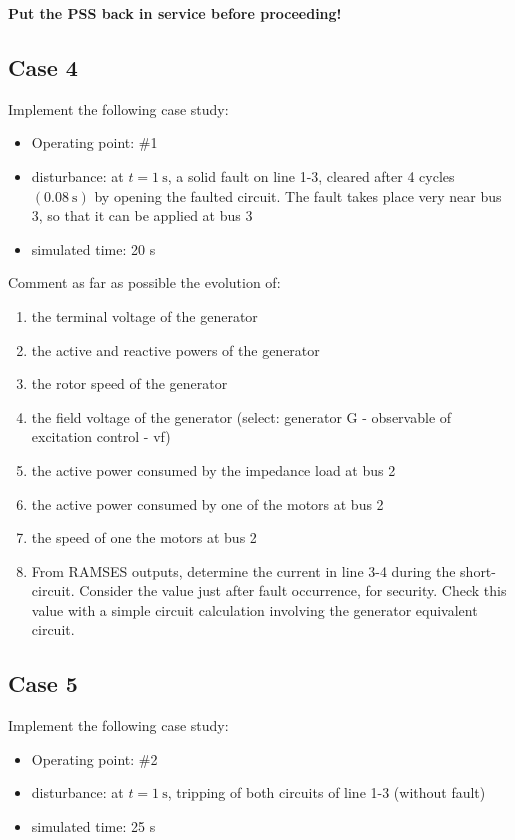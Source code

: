 \documentclass[a4paper,11pt,oneside,onecolumn]{article}
\begin{document}
\noindent \textbf{Put the PSS back in service before proceeding!}

\subsection{Case 4}

Implement the following case study:
\begin{itemize}
\item Operating point: \#1
\item disturbance: at $t=1 \mathrm{~s}$, a solid fault on line 1-3, cleared after 4 cycles $(0.08 \mathrm{~s})$ by opening the faulted circuit. The fault takes place very near bus 3, so that it can be applied at bus 3
\item simulated time: 20 s
\end{itemize}

\noindent Comment as far as possible the evolution of:
\begin{enumerate}
\item the terminal voltage of the generator
\item the active and reactive powers of the generator
\item the rotor speed of the generator
\item the field voltage of the generator (select: generator G - observable of excitation control - vf)
\item the active power consumed by the impedance load at bus 2
\item the active power consumed by one of the motors at bus 2
\item the speed of one the motors at bus 2
\item From RAMSES outputs, determine the current in line 3-4 during the short-circuit. Consider the value just after fault occurrence, for security. Check this value with a simple circuit calculation involving the generator equivalent circuit.
\end{enumerate}

\subsection{Case 5}

Implement the following case study:
\begin{itemize}
\item Operating point: \#2
\item disturbance: at $t=1 \mathrm{~s}$, tripping of both circuits of line 1-3 (without fault)
\item simulated time: 25 s
\end{itemize}
\end{document}
